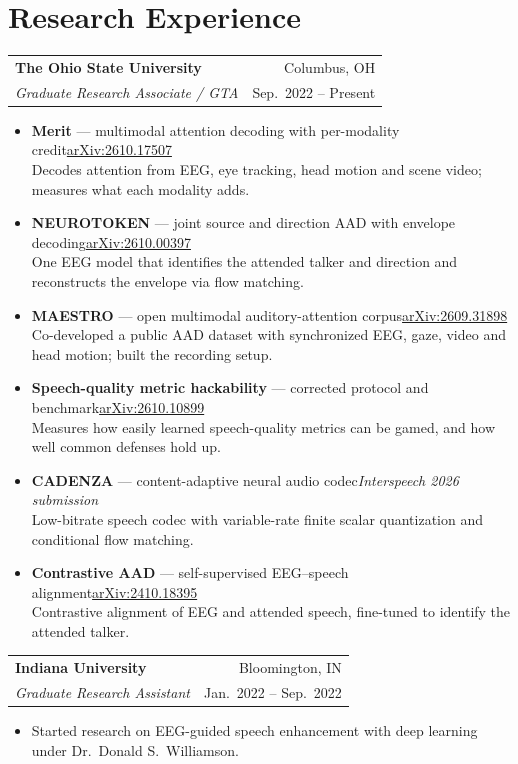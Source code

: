 \documentclass[10pt,letterpaper]{article}
\makeatletter
\newcommand{\entry}[4]{%
  \begin{tabularx}{\linewidth}{@{}X r@{}}
    \textbf{#1} & {\color{muted}#2} \\
    \textit{#3} & {\color{muted}\small #4}
  \end{tabularx}\par\vspace{1pt}}
\newcommand{\project}[3]{\textbf{#1} --- #2\hfill{\small #3}}
\newcommand{\arxiv}[1]{\href{https://arxiv.org/abs/#1}{\color{accent}arXiv:#1}}
\newcommand{\venue}[1]{{\color{muted}\textit{#1}}}
\makeatother
\begin{document}
\section{Research Experience}
\entry{The Ohio State University}{Columbus, OH}{Graduate Research Associate / GTA}{Sep.\ 2022 -- Present}
\begin{itemize}
  \item \project{Merit}{multimodal attention decoding with per-modality credit}{\arxiv{2610.17507}}\\
    Decodes attention from EEG, eye tracking, head motion and scene video; measures what each modality adds.
  \item \project{NEUROTOKEN}{joint source and direction AAD with envelope decoding}{\arxiv{2610.00397}}\\
    One EEG model that identifies the attended talker and direction and reconstructs the envelope via flow matching.
  \item \project{MAESTRO}{open multimodal auditory-attention corpus}{\arxiv{2609.31898}}\\
    Co-developed a public AAD dataset with synchronized EEG, gaze, video and head motion; built the recording setup.
  \item \project{Speech-quality metric hackability}{corrected protocol and benchmark}{\arxiv{2610.10899}}\\
    Measures how easily learned speech-quality metrics can be gamed, and how well common defenses hold up.
  \item \project{CADENZA}{content-adaptive neural audio codec}{\venue{Interspeech 2026 submission}}\\
    Low-bitrate speech codec with variable-rate finite scalar quantization and conditional flow matching.
  \item \project{Contrastive AAD}{self-supervised EEG--speech alignment}{\arxiv{2410.18395}}\\
    Contrastive alignment of EEG and attended speech, fine-tuned to identify the attended talker.
\end{itemize}
\vspace{1pt}
\entry{Indiana University}{Bloomington, IN}{Graduate Research Assistant}{Jan.\ 2022 -- Sep.\ 2022}
\begin{itemize}
  \item Started research on EEG-guided speech enhancement with deep learning under Dr.\ Donald S.\ Williamson.
\end{itemize}

\end{document}
